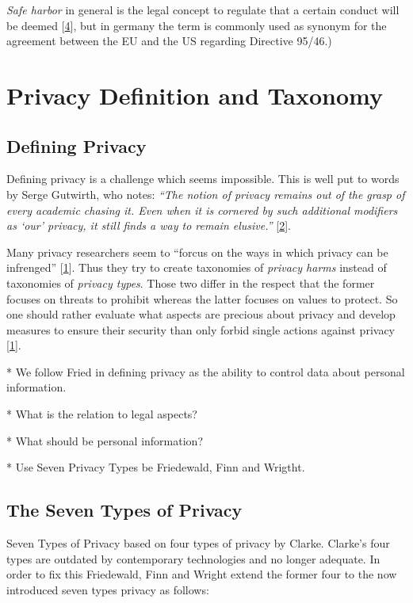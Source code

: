 \emph{Safe harbor} in general is the legal concept to regulate that a certain conduct will be deemed {[}\hyperref[references]{4}{]}, but in germany the term is commonly used as synonym for the agreement between the EU and the US regarding Directive 95/46.)

\section{Privacy Definition and Taxonomy}

\subsection{Defining Privacy}

Defining privacy is a challenge which seems impossible. This is well put to words by Serge Gutwirth, who notes: \emph{``The notion of privacy remains out of the grasp of every academic chasing it. Even when it is cornered by such additional modifiers as `our' privacy, it still finds a way to remain elusive.''} {[}\hyperref[references]{2}{]}.

Many privacy researchers seem to ``forcus on the ways in which privacy can be infrenged'' {[}\hyperref[references]{1}{]}.
Thus they try to create taxonomies of \emph{privacy harms} instead of taxonomies of \emph{privacy types}.
Those two differ in the respect that the former focuses on threats to prohibit whereas the latter focuses on values to protect.
So one should rather evaluate what aspects are precious about privacy and develop measures to ensure their security than only forbid single actions against privacy {[}\hyperref[references]{1}{]}.


* We follow Fried in defining privacy as the ability to control data about personal information.

* What is the relation to legal aspects?

* What should be personal information?

* Use Seven Privacy Types be Friedewald, Finn and Wrigtht.

\subsection{The Seven Types of Privacy}

Seven Types of Privacy based on four types of privacy by Clarke.
Clarke's four types are outdated by contemporary technologies and no longer adequate. 
In order to fix this Friedewald, Finn and Wright extend the former four to the now introduced seven types privacy as follows:

